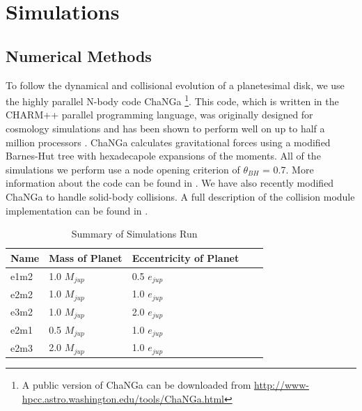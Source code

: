 \documentclass[twocolumn]{aastex63}
\begin{document}
\section{Simulations} \label{sec:sims}

\subsection{Numerical Methods}\label{sec:methods}

To follow the dynamical and collisional evolution of a planetesimal disk, we use the highly parallel N-body code {\sc ChaNGa} 
\footnote{A public version of {\sc ChaNGa} can be downloaded from \url{http://www-hpcc.astro.washington.edu/tools/ChaNGa.html}}. 
This code, which is written in the {\sc CHARM++} parallel programming language, was originally designed for cosmology simulations 
and has been shown to perform well on up to half a million processors \citep{2015AphCom..2..1}. {\sc ChaNGa} calculates 
gravitational forces using a modified Barnes-Hut \citep{1986Natur.324..446B} tree with hexadecapole expansions of the moments. 
All of the simulations we perform use a node opening criterion of $\theta_{BH}$ = 0.7. More information about the code can be found 
in \citet{2008IEEEpds...ChaNGa}. We have also recently modified {\sc ChaNGa} to handle solid-body collisions. A full description of 
the collision module implementation can be found in \citet{2019MNRAS.489.2159W}.

\begin{table}
\begin{center}
\caption{Summary of Simulations Run}
\begin{tabular}{lllll} \hline \hline
Name     & Mass of Planet & Eccentricity of Planet &  &  \\ \hline
e1m2 & 1.0 $M_{jup}$                     & 0.5 $e_{jup}$                            &  &  \\
e2m2      & 1.0 $M_{jup}$                     & 1.0 $e_{jup}$                             &  &  \\
e3m2 & 1.0 $M_{jup}$                     & 2.0 $e_{jup}$                             &  &  \\
e2m1 & 0.5 $M_{jup}$                   & 1.0 $e_{jup}$                             &  &  \\
e2m3 & 2.0 $M_{jup}$                     & 1.0 $e_{jup}$                             &  &  \\ \hline
\end{tabular}
\label{tab:sims}
\end{center}
\end{table}
\end{document}
